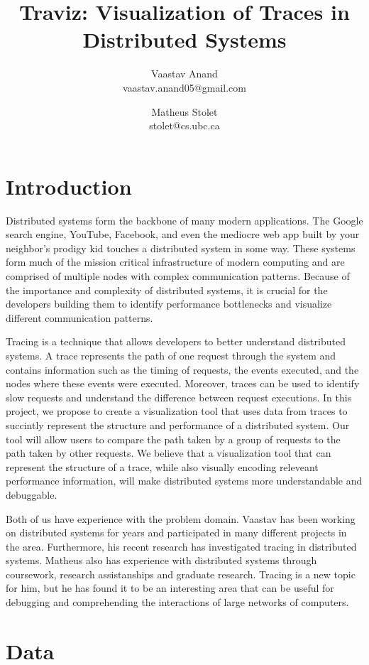 \documentclass{article}
\title{Traviz: Visualization of Traces in Distributed Systems}
\author{Vaastav Anand \\ vaastav.anand05@gmail.com  \and Matheus Stolet \\ stolet@cs.ubc.ca}
\date{}
\begin{document}
\maketitle

\section{Introduction}

Distributed systems form the backbone of many modern applications. The Google search engine,
YouTube, Facebook, and even the mediocre web app built by your neighbor's prodigy kid touches
a distributed system in some way. These systems form much of the mission critical infrastructure
of modern computing and are comprised of multiple nodes with complex communication patterns. Because
of the importance and complexity of distributed systems, it is crucial for the developers building
them to identify performance bottlenecks and visualize different communication patterns. 

Tracing is a technique that allows developers to better understand distributed systems. A trace represents the
path of one request through the system and contains information such as the timing of requests, 
the events executed, and the nodes where these events were executed. Moreover, traces can be used
to identify slow requests and understand the difference between request executions. In this project, we
propose to create a visualization tool that uses data from traces to succintly represent the structure 
and performance of a distributed system. Our tool will allow users to compare the path taken by a group
of requests to the path taken by other requests. We believe that a visualization tool that can represent the
structure of a trace, while also visually encoding releveant performance information, will make distributed
systems more understandable and debuggable.

Both of us have experience with the problem domain. Vaastav has been working on distributed systems for years
and participated in many different projects in the area. Furthermore, his recent research has investigated
tracing in distributed systems. Matheus also has experience with distributed systems through coursework,
research assistanships and graduate research. Tracing is a new topic for him, but he has found it to be
an interesting area that can be useful for debugging and comprehending the interactions of large networks
of computers.

\section{Data}
\end{document}
